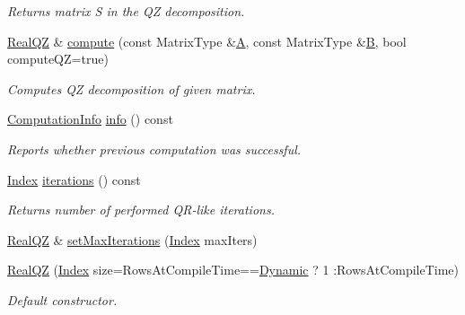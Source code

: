 \begin{DoxyCompactItemize}
\begin{DoxyCompactList}\small\item\em Returns matrix S in the QZ decomposition. \end{DoxyCompactList}\item 
\hyperlink{group___eigenvalues___module_class_eigen_1_1_real_q_z}{Real\+QZ} \& \hyperlink{group___eigenvalues___module_a2b6847964d9f1903193cc3e67c196849}{compute} (const Matrix\+Type \&\hyperlink{group___core___module_class_eigen_1_1_matrix}{A}, const Matrix\+Type \&\hyperlink{group___core___module_class_eigen_1_1_matrix}{B}, bool compute\+QZ=true)
\begin{DoxyCompactList}\small\item\em Computes QZ decomposition of given matrix. \end{DoxyCompactList}\item 
\hyperlink{group__enums_ga85fad7b87587764e5cf6b513a9e0ee5e}{Computation\+Info} \hyperlink{group___eigenvalues___module_a36bd77afed89f3f5c110a715e69e4c64}{info} () const
\begin{DoxyCompactList}\small\item\em Reports whether previous computation was successful. \end{DoxyCompactList}\item 
\mbox{\label{group___eigenvalues___module_afbecc6d0ab1de42be9db79428da48ab6}} 
\hyperlink{group___eigenvalues___module_a6201e534e901b5f4e66f72c176b534a3}{Index} \hyperlink{group___eigenvalues___module_afbecc6d0ab1de42be9db79428da48ab6}{iterations} () const
\begin{DoxyCompactList}\small\item\em Returns number of performed Q\+R-\/like iterations. \end{DoxyCompactList}\item 
\hyperlink{group___eigenvalues___module_class_eigen_1_1_real_q_z}{Real\+QZ} \& \hyperlink{group___eigenvalues___module_a30ae65666b1757e4a2b6a28eaec12226}{set\+Max\+Iterations} (\hyperlink{group___eigenvalues___module_a6201e534e901b5f4e66f72c176b534a3}{Index} max\+Iters)
\item 
\hyperlink{group___eigenvalues___module_ad8fb9235870a8361a2fdd8dcc2e80d01}{Real\+QZ} (\hyperlink{group___eigenvalues___module_a6201e534e901b5f4e66f72c176b534a3}{Index} size=Rows\+At\+Compile\+Time==\hyperlink{namespace_eigen_ad81fa7195215a0ce30017dfac309f0b2}{Dynamic} ? 1 \+:Rows\+At\+Compile\+Time)
\begin{DoxyCompactList}\small\item\em Default constructor. \end{DoxyCompactList}\item 

\end{DoxyCompactItemize}
